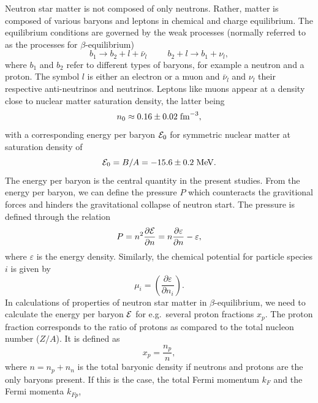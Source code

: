 Neutron star matter is not composed of only neutrons. Rather, matter is composed of various baryons and leptons in chemical and charge equilibrium.
The equilibrium conditions are governed by the weak
processes (normally referred to as the processes for
$\beta$-equilibrium)
\begin{equation} 
      b_1 \rightarrow b_2 + l +\bar{\nu}_l \hspace{1cm} b_2 +l \rightarrow b_1 
+\nu_l,
      \label{eq:betadecay}
\end{equation}
where $b_1$ and $b_2$ refer to  different types of baryons, for example a neutron and a proton.  
The symbol $l$ is either an electron or a muon and  $\bar{\nu}_l $
and $\nu_l$ their respective anti-neutrinos and neutrinos. Leptons like muons 
appear at
a density close to nuclear matter saturation density, the latter being
\[
     n_0 \approx 0.16 \pm 0.02 \hspace{0.1cm} \mathrm{fm}^{-3},
\]
with a corresponding energy per baryon ${\cal E}_0$ 
for symmetric nuclear matter at saturation density of
\[
     {\cal E}_0 = B/A=-15.6\pm 0.2 \hspace{0.1cm} \mathrm{MeV}.
\]
The energy per baryon is the central quantity in the present studies. From the energy per baryon, we can define the pressure 
$P$ which counteracts the gravitional forces and hinders the gravitational collapse of neutron start. The pressure  is defined through the relation
\begin{equation}
    P=n^2\frac{\partial {\cal E}}{\partial n}=
      n\frac{\partial \varepsilon}{\partial n}-\varepsilon,
\end{equation}
where $\varepsilon$ is the energy density. 
Similarly, the chemical potential for particle species $i$
is given by
\begin{equation}
     \mu_i = \left(\frac{\partial \varepsilon}{\partial n_i}\right).
     \label{eq:chemicalpotdef}
\end{equation}
In calculations of properties of neutron star matter in $\beta$-equilibrium,
we need to calculate the energy per baryon ${\cal E}$ for e.g.~several 
proton fractions $x_p$. The proton fraction corresponds to
the ratio of protons as
compared to the total nucleon number ($Z/A$). It is 
 defined as
\begin{equation}
    x_p = \frac{n_p}{n},
\end{equation}
where $n=n_p+n_n$ is the total baryonic density if neutrons and
protons are the only baryons present. If this is the case,
the total Fermi momentum $k_F$ and the Fermi momenta $k_{Fp}$,
